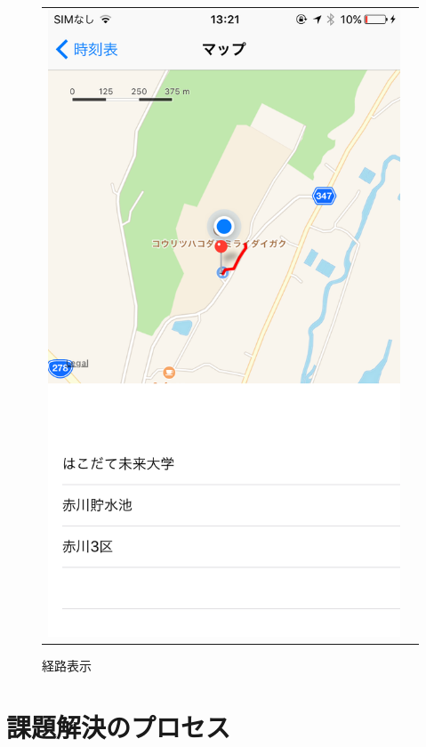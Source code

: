 \documentclass[openany,11pt,papersize]{jsbook}
\begin{document}
\begin{figure}[H]
\begin{tabular}{cc}
\begin{minipage}[t]{0.45\hsize}
        \includegraphics[keepaspectratio, scale=0.2]{img/root.png}
        \caption{経路表示}
        \label{fig:root}
      \end{minipage}\\
    \end{tabular}
  \end{figure}

\chapter{課題解決のプロセス}
\end{document}
